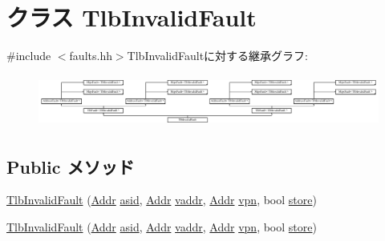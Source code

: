 \hypertarget{classMipsISA_1_1TlbInvalidFault}{
\section{クラス TlbInvalidFault}
\label{classMipsISA_1_1TlbInvalidFault}
}


{\ttfamily \#include $<$faults.hh$>$}TlbInvalidFaultに対する継承グラフ:\begin{figure}[H]
\begin{center}
\leavevmode
\includegraphics[height=1.74129cm]{classMipsISA_1_1TlbInvalidFault}
\end{center}
\end{figure}
\subsection*{Public メソッド}
\begin{DoxyCompactItemize}
\item 
\hyperlink{classMipsISA_1_1TlbInvalidFault_a814c2ca9e5a3f551b9c44ef56e3f2e73}{TlbInvalidFault} (\hyperlink{classm5_1_1params_1_1Addr}{Addr} \hyperlink{classMipsISA_1_1TlbFault_a3bd75b410169a5c0e356fda4d021e49c}{asid}, \hyperlink{classm5_1_1params_1_1Addr}{Addr} \hyperlink{classMipsISA_1_1AddressFault_a9f933b300ef63eea367ca82f8da31025}{vaddr}, \hyperlink{classm5_1_1params_1_1Addr}{Addr} \hyperlink{classMipsISA_1_1TlbFault_ad378f7d20675898b2a5994600528fa9a}{vpn}, bool \hyperlink{classMipsISA_1_1AddressFault_a86c0e52eeb2243d66bc032096c160a0b}{store})
\item 
\hyperlink{classMipsISA_1_1TlbInvalidFault_a814c2ca9e5a3f551b9c44ef56e3f2e73}{TlbInvalidFault} (\hyperlink{classm5_1_1params_1_1Addr}{Addr} \hyperlink{classMipsISA_1_1TlbFault_a3bd75b410169a5c0e356fda4d021e49c}{asid}, \hyperlink{classm5_1_1params_1_1Addr}{Addr} \hyperlink{classMipsISA_1_1AddressFault_a9f933b300ef63eea367ca82f8da31025}{vaddr}, \hyperlink{classm5_1_1params_1_1Addr}{Addr} \hyperlink{classMipsISA_1_1TlbFault_ad378f7d20675898b2a5994600528fa9a}{vpn}, bool \hyperlink{classMipsISA_1_1AddressFault_a86c0e52eeb2243d66bc032096c160a0b}{store})
\end{DoxyCompactItemize}


